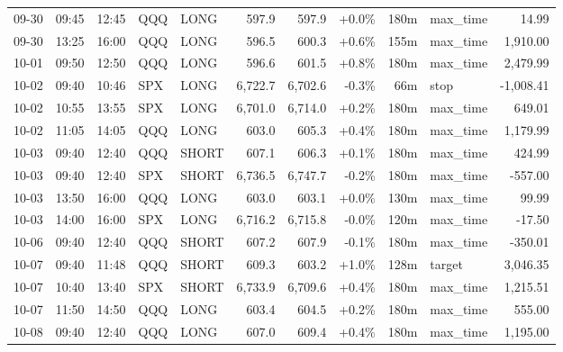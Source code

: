 \documentclass[11pt,a4paper,twoside]{article}
\begin{document}
\begin{center}
\begin{longtable}{>{\color{txtmain}}l l l l l r r r r >{\color{txtmain}}l r}
09-30 & 09:45 & 12:45 & QQQ & LONG & 597.9 & 597.9 & \textcolor{wingreen}{+0.0\%} & 180m & max\_time & \textcolor{wingreen}{14.99} \\
09-30 & 13:25 & 16:00 & QQQ & LONG & 596.5 & 600.3 & \textcolor{wingreen}{+0.6\%} & 155m & max\_time & \textcolor{wingreen}{1,910.00} \\
10-01 & 09:50 & 12:50 & QQQ & LONG & 596.6 & 601.5 & \textcolor{wingreen}{+0.8\%} & 180m & max\_time & \textcolor{wingreen}{2,479.99} \\
10-02 & 09:40 & 10:46 & SPX & LONG & 6,722.7 & 6,702.6 & \textcolor{lossred}{-0.3\%} & 66m & stop & \textcolor{lossred}{-1,008.41} \\
10-02 & 10:55 & 13:55 & SPX & LONG & 6,701.0 & 6,714.0 & \textcolor{wingreen}{+0.2\%} & 180m & max\_time & \textcolor{wingreen}{649.01} \\
10-02 & 11:05 & 14:05 & QQQ & LONG & 603.0 & 605.3 & \textcolor{wingreen}{+0.4\%} & 180m & max\_time & \textcolor{wingreen}{1,179.99} \\
10-03 & 09:40 & 12:40 & QQQ & SHORT & 607.1 & 606.3 & \textcolor{wingreen}{+0.1\%} & 180m & max\_time & \textcolor{wingreen}{424.99} \\
10-03 & 09:40 & 12:40 & SPX & SHORT & 6,736.5 & 6,747.7 & \textcolor{lossred}{-0.2\%} & 180m & max\_time & \textcolor{lossred}{-557.00} \\
10-03 & 13:50 & 16:00 & QQQ & LONG & 603.0 & 603.1 & \textcolor{wingreen}{+0.0\%} & 130m & max\_time & \textcolor{wingreen}{99.99} \\
10-03 & 14:00 & 16:00 & SPX & LONG & 6,716.2 & 6,715.8 & \textcolor{lossred}{-0.0\%} & 120m & max\_time & \textcolor{lossred}{-17.50} \\
10-06 & 09:40 & 12:40 & QQQ & SHORT & 607.2 & 607.9 & \textcolor{lossred}{-0.1\%} & 180m & max\_time & \textcolor{lossred}{-350.01} \\
10-07 & 09:40 & 11:48 & QQQ & SHORT & 609.3 & 603.2 & \textcolor{wingreen}{+1.0\%} & 128m & target & \textcolor{wingreen}{3,046.35} \\
10-07 & 10:40 & 13:40 & SPX & SHORT & 6,733.9 & 6,709.6 & \textcolor{wingreen}{+0.4\%} & 180m & max\_time & \textcolor{wingreen}{1,215.51} \\
10-07 & 11:50 & 14:50 & QQQ & LONG & 603.4 & 604.5 & \textcolor{wingreen}{+0.2\%} & 180m & max\_time & \textcolor{wingreen}{555.00} \\
10-08 & 09:40 & 12:40 & QQQ & LONG & 607.0 & 609.4 & \textcolor{wingreen}{+0.4\%} & 180m & max\_time & \textcolor{wingreen}{1,195.00} \\

\end{longtable}
\end{center}
\end{document}
